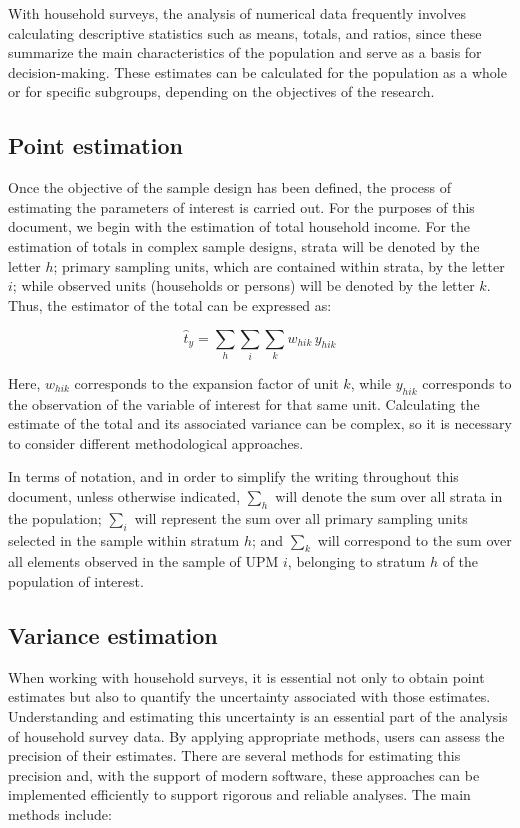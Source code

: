 \documentclass[
  english,
  12pt,
]{book}
\begin{document}
With household surveys, the analysis of numerical data frequently involves calculating descriptive statistics such as means, totals, and ratios, since these summarize the main characteristics of the population and serve as a basis for decision-making. These estimates can be calculated for the population as a whole or for specific subgroups, depending on the objectives of the research.

\subsection{Point estimation}\label{estimacion-puntual}

Once the objective of the sample design has been defined, the process of estimating the parameters of interest is carried out. For the purposes of this document, we begin with the estimation of total household income. For the estimation of totals in complex sample designs, strata will be denoted by the letter \(h\); primary sampling units, which are contained within strata, by the letter \(i\); while observed units (households or persons) will be denoted by the letter \(k\). Thus, the estimator of the total can be expressed as:

\[
\hat{t}_y = \sum_{h} \sum_{i} \sum_{k} w_{hik} \, y_{hik}
\]

Here, \(w_{hik}\) corresponds to the expansion factor of unit \(k\), while \(y_{hik}\) corresponds to the observation of the variable of interest for that same unit. Calculating the estimate of the total and its associated variance can be complex, so it is necessary to consider different methodological approaches.

In terms of notation, and in order to simplify the writing throughout this document, unless otherwise indicated, \(\sum_{h}\) will denote the sum over all strata in the population; \(\sum_{i}\) will represent the sum over all primary sampling units selected in the sample within stratum \(h\); and \(\sum_{k}\) will correspond to the sum over all elements observed in the sample of UPM \(i\), belonging to stratum \(h\) of the population of interest.

\subsection{Variance estimation}\label{estimacion-de-la-varianza}

When working with household surveys, it is essential not only to obtain point estimates but also to quantify the uncertainty associated with those estimates. Understanding and estimating this uncertainty is an essential part of the analysis of household survey data. By applying appropriate methods, users can assess the precision of their estimates. There are several methods for estimating this precision and, with the support of modern software, these approaches can be implemented efficiently to support rigorous and reliable analyses. The main methods include:
\end{document}
